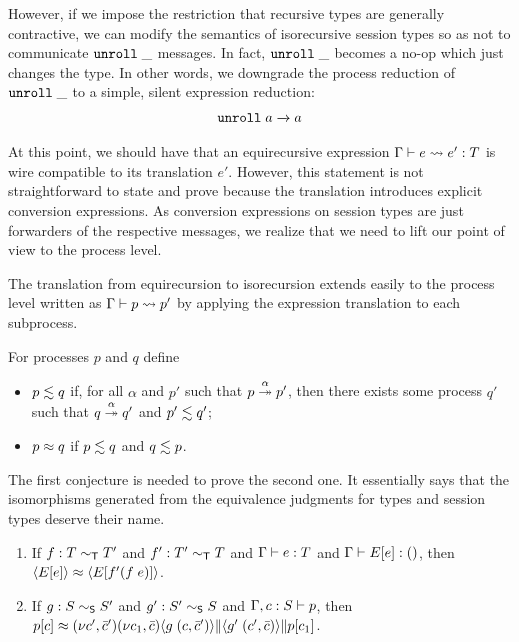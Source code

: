 However, if we impose the restriction that recursive types are
generally contractive, we can modify the semantics of isorecursive
session types so as not to communicate $\EUnroll\_$ messages. In fact,
$\EUnroll\_$ becomes a no-op which just changes the type. In other
words, we downgrade the process reduction of $\EUnroll\_$ to a simple,
silent expression reduction:
\begin{gather*}
  \reduce{\EUnroll a}{a}
\end{gather*}

At this point, we should have that an equirecursive expression
$\translation e{e'} T$ is wire compatible to its translation
$e'$. However, this statement is not straightforward to state and
prove because the translation introduces explicit conversion
expressions. As conversion expressions on session types are
just forwarders of the respective messages, we realize that we need to
lift our point of view to the process level.

The translation from equirecursion to isorecursion extends easily to
the process level written as $\Ptranslation p{p'}$ by applying the
expression translation to each subprocess.


\begin{definition}
  For processes $p$ and $q$ define
  \begin{itemize}
  \item $p \leftsim q$ if, for all $\alpha$ and $p'$ such that
    $\reducemany[\alpha] p{p'}$, then there exists some process $q'$
    such that $\reducemany[\alpha] q{q'}$ and $p' \leftsim q'$;
  \item $p \bisim q$ if $p \leftsim q$ and $q \leftsim p$.
  \end{itemize}
\end{definition}

The first conjecture is needed to prove the second one. It essentially
says that the isomorphisms generated from the equivalence judgments
for types and session types deserve their name.

\begin{conjecture}[Conversion]
  \begin{enumerate}
  \item
    If $f : T \eqt T'$ and $f' : T' \eqt T$ and $\typing eT$ and
    $\typing {E[e]}\TUnit$, then 
    $\PExp{E[e]} \bisim \PExp{E[f' (f\;e)]}$.
  \item If $g : S \eqs S'$
    and $g' : S' \eqs S$
    and $\Ptyping[\Ctxt, c : S]p$, then\\
    $p[c] \bisim
    \PScope[c', \bar c']\PScope[c_1, \bar c]
    \PPar{\PPar {\PExp{g \; (c, \bar c')}}{\PExp{g' \; (c', \bar c)}}}{p[c_1]}$.
  \end{enumerate}
\end{conjecture}


